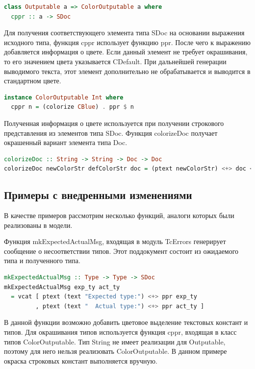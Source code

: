 \begin{lstlisting}[language=Haskell, caption=Класс типов ColorOutputable]
class Outputable a => ColorOutputable a where
  cppr :: a -> SDoc
\end{lstlisting}

Для получения соответствующего элемента типа SDoc на основании выражения исходного типа, функция cppr использует функцию ppr. После чего к выражению добавляется информация о цвете. Если данный элемент не требует окрашивания, то его значением цвета указывается CDefault. При дальнейшей генерации выводимого текста, этот элемент дополнительно не обрабатывается и выводится в стандартном цвете.

\begin{lstlisting}[language=Haskell, caption=Пример реализации ColorOutputable для типа Int]
instance ColorOutputable Int where
  cppr n = (colorize CBlue) . ppr $ n
\end{lstlisting}

Полученная информация о цвете используется при получении строкового представления из элементов типа SDoc. Функция colorizeDoc получает окрашенный вариант элемента типа Doc.

\begin{lstlisting}[language=Haskell]
colorizeDoc :: String -> String -> Doc -> Doc
colorizeDoc newColorStr defColorStr doc = (ptext newColorStr) <+> doc <+> (ptext defColorStr)
\end{lstlisting}


\subsection{Примеры с внедренными изменениями}

В качестве примеров рассмотрим несколько функций, аналоги которых были реализованы в модели.

Функция mkExpectedActualMsg, входящая в модуль TcErrors генерирует сообщение о несоответствии типов. Этот поддокумент состоит из ожидаемого типа и полученного типа.

\begin{lstlisting}[language=Haskell]
mkExpectedActualMsg :: Type -> Type -> SDoc
mkExpectedActualMsg exp_ty act_ty
  = vcat [ ptext (text "Expected type:") <+> ppr exp_ty
         , ptext (text "  Actual type:") <+> ppr act_ty ]
\end{lstlisting}

В данной функции возможно добавить цветовое выделение текстовых констант и типов. Для окрашивания типов используется функция cppr, входящая в класс типов ColorOutputable. Тип String не имеет реализации для Outputable, поэтому для него нельзя реализовать ColorOutputable. В данном примере окраска строковых констант выполняется вручную.

